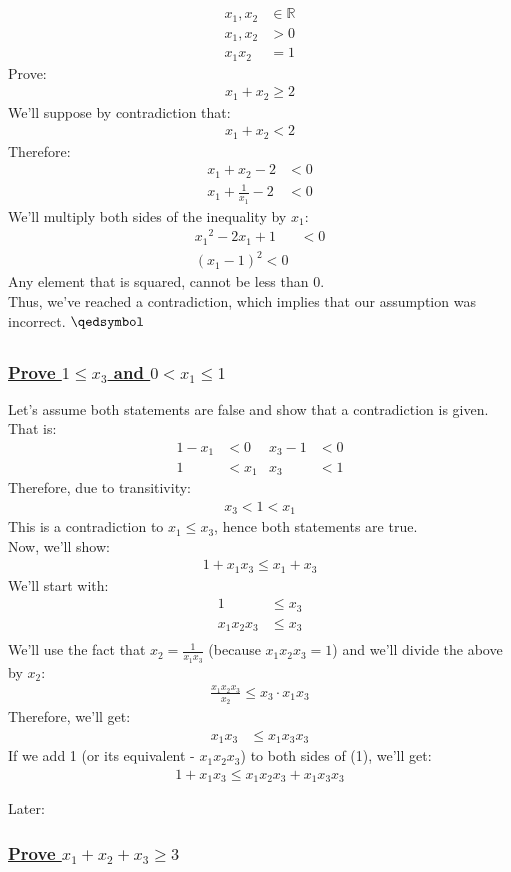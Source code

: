 \documentclass[a4paper, 12pt]{article}
\newcommand{\sub}[1]{\subsection{\underline{#1}}}
\newcommand{\subsub}[1]{\subsubsection{\underline{#1}}}
\newcommand{\R}{\ensuremath{\mathbb{R}}}
\newcommand{\eq}[1]{\begin{align*}#1\end{align*}}
\newcommand{\eqn}[1]{\begin{align}#1\end{align}}
\renewcommand{\qed}{\hfill\(\qedsymbol\)}
\begin{document}
\section{}
\sub{}
\eq{
    x_1,x_2&\in\R\\
    x_1, x_2&>0\\
    x_1x_2&=1
}
Prove:
    \eq{x_1+x_2\geq{2}}
We'll suppose by contradiction that:
\eq{
    x_1+x_2<2
}
Therefore:
\eq{
    x_1+x_2-2&<0\\
    x_1+\frac{1}{x_1}-2&<0
}
We'll multiply both sides of the inequality by $x_1$:
\eq{
    {x_1}^2-2x_1+1&<0\\
    (x_1-1)^2<0
}
Any element that is squared, cannot be less than 0.\\
Thus, we've reached a contradiction, which implies that our assumption was incorrect.
\qed

\sub{}
\subsub{Prove $1\leq{x_3}$ and $0<x_1\leq{1}$}
Let's assume both statements are false and show that a contradiction is given.\\
That is:
\eq{
    1-x_1&<0 & x_3-1&<0\\
    1&<x_1 & x_3&<1
}
Therefore, due to transitivity:
\eq{
    x_3<1<x_1
}
This is a contradiction to $x_1\leq{x_3}$, hence both statements are true.\\
Now, we'll show:
\eq{
    1+x_1x_3\leq{x_1+x_3}
}
We'll start with:
\eq{
    {1}&\leq{x_3}\\
    x_1x_2x_3&\leq{x_3}\\
}
We'll use the fact that $x_2=\frac{1}{x_1x_3}$ (because $x_1x_2x_3=1$) and we'll divide the above by $x_2$:
\eq{
    \frac{x_1x_2x_3}{x_2}\leq{x_3}\cdot{x_1x_3}
}
Therefore, we'll get:
\eqn{x_1x_3&\leq{x_1x_3x_3}}
If we add 1 (or its equivalent - $x_1x_2x_3$) to both sides of (1), we'll get:
\eqn{
    1+x_1x_3\leq{x_1x_2x_3}+x_1x_3x_3
}


Later:
\subsub{Prove $x_1+x_2+x_3\geq{3}$}


\end{document}
